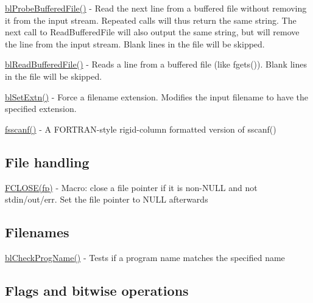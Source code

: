 \begin{DoxyItemize}
\item \hyperlink{_buff_inp_8c_af2f8ac1768c69aa27b560682db7edd21}{bl\-Probe\-Buffered\-File()} -\/ Read the next line from a buffered file without removing it from the input stream. Repeated calls will thus return the same string. The next call to Read\-Buffered\-File will also output the same string, but will remove the line from the input stream. Blank lines in the file will be skipped.
\item \hyperlink{_buff_inp_8c_a864c0d980dc89905ca299967b0fd8f48}{bl\-Read\-Buffered\-File()} -\/ Reads a line from a buffered file (like fgets()). Blank lines in the file will be skipped.
\item \hyperlink{general_8h_ae5bf7680943b697923bc16e550896d1a}{bl\-Set\-Extn()} -\/ Force a filename extension. Modifies the input filename to have the specified extension.
\item \hyperlink{fsscanf_8c_aa785b0c5d909efffc6b0a82a79a0ec50}{fsscanf()} -\/ A F\-O\-R\-T\-R\-A\-N-\/style rigid-\/column formatted version of sscanf()
\end{DoxyItemize}

\subsection*{File handling }


\begin{DoxyItemize}
\item \hyperlink{macros_8h_a734fdddfd354177d67337218bc963d67}{F\-C\-L\-O\-S\-E(fp)} -\/ Macro\-: close a file pointer if it is non-\/\-N\-U\-L\-L and not stdin/out/err. Set the file pointer to N\-U\-L\-L afterwards
\end{DoxyItemize}

\subsection*{Filenames }


\begin{DoxyItemize}
\item \hyperlink{filename_8c_ae1a090231e92e19926215f1d7feecbed}{bl\-Check\-Prog\-Name()} -\/ Tests if a program name matches the specified name
\end{DoxyItemize}

\subsection*{Flags and bitwise operations }


